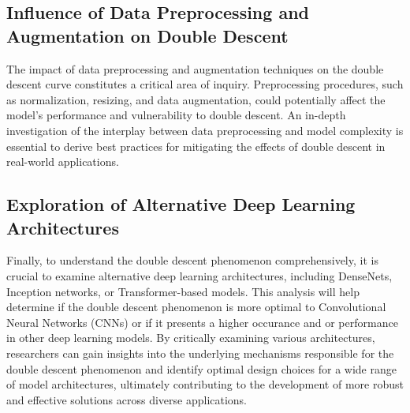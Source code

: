 \subsection{Influence of Data Preprocessing and Augmentation on Double Descent}
The impact of data preprocessing and augmentation techniques on the double descent curve constitutes a critical area of inquiry. Preprocessing procedures, such as normalization, resizing, and data augmentation, could potentially affect the model's performance and vulnerability to double descent. An in-depth investigation of the interplay between data preprocessing and model complexity is essential to derive best practices for mitigating the effects of double descent in real-world applications.

\subsection{Exploration of Alternative Deep Learning Architectures}
Finally, to understand the double descent phenomenon comprehensively, it is crucial to examine alternative deep learning architectures, including DenseNets, Inception networks, or Transformer-based models. This analysis will help determine if the double descent phenomenon is more optimal to Convolutional Neural Networks (CNNs) or if it presents a higher occurance and or performance in other deep learning models. By critically examining various architectures, researchers can gain insights into the underlying mechanisms responsible for the double descent phenomenon and identify optimal design choices for a wide range of model architectures, ultimately contributing to the development of more robust and effective solutions across diverse applications.